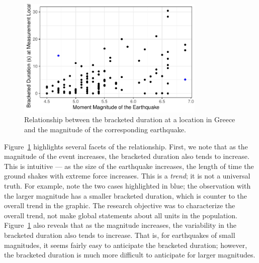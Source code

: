 \documentclass[
  letterpaper,
  DIV=11,
  numbers=noendperiod]{scrreprt}
\theoremstyle{plain}
\theoremstyle{definition}
\theoremstyle{definition}
\theoremstyle{remark}
\begin{document}
\begin{figure}

{\centering \includegraphics[width=0.8\textwidth,height=\textheight]{./images/fig-regsummaries-magnitude-1.pdf}

}

\caption{\label{fig-regsummaries-magnitude}Relationship between the
bracketed duration at a location in Greece and the magnitude of the
corresponding earthquake.}

\end{figure}

Figure~\ref{fig-regsummaries-magnitude} highlights several facets of the
relationship. First, we note that as the magnitude of the event
increases, the bracketed duration also tends to increase. This is
intuitive --- as the size of the earthquake increases, the length of
time the ground shakes with extreme force increases. This is a
\emph{trend}; it is not a universal truth. For example, note the two
cases highlighted in blue; the observation with the larger magnitude has
a smaller bracketed duration, which is counter to the overall trend in
the graphic. The research objective was to characterize the overall
trend, not make global statements about all units in the population.
Figure~\ref{fig-regsummaries-magnitude} also reveals that as the
magnitude increases, the variability in the bracketed duration also
tends to increase. That is, for earthquakes of small magnitudes, it
seems fairly easy to anticipate the bracketed duration; however, the
bracketed duration is much more difficult to anticipate for larger
magnitudes.
\end{document}
